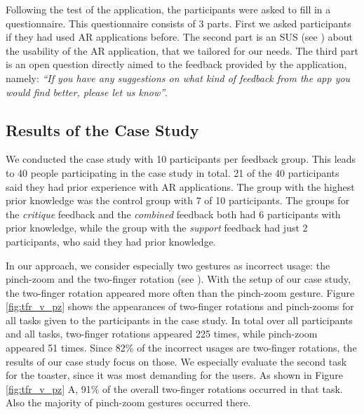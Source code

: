 \documentclass[11pt, a4paper]{article}
\begin{document}
			Following the test of the application, the participants were asked to fill in a questionnaire. This questionnaire consists of 3 parts. First we asked participants if they had used \ac{AR} applications before. The second part is an \ac{SUS} (see ) about the usability of the \ac{AR} application, that we tailored for our needs. The third part is an open question directly aimed to the feedback provided by the application, namely: \emph{``If you have any suggestions on what kind of feedback from the app you would find better, please let us know''}.

		\subsection*{Results of the Case Study}\label{ssec:results}

			We conducted the case study with 10 participants per feedback group. This leads to 40 people participating in the case study in total. 21 of the 40 participants said they had prior experience with \ac{AR} applications. The group with the highest prior knowledge was the control group with 7 of 10 participants. The groups for the \emph{critique} feedback and the \emph{combined} feedback both had 6 participants with prior knowledge, while the group with the \emph{support} feedback had just 2 participants, who said they had prior knowledge.

			In our approach, we consider especially two gestures as incorrect usage: the pinch-zoom and the two-finger rotation (see ). With the setup of our case study, the two-finger rotation appeared more often than the pinch-zoom gesture. Figure \ref{fig:tfr_v_pz} shows the appearances of two-finger rotations and pinch-zooms for all tasks given to the participants in the case study. In total over all participants and all tasks, two-finger rotations appeared 225 times, while pinch-zoom appeared 51 times. Since 82\% of the incorrect usages are two-finger rotations, the results of our case study focus on those. We especially evaluate the second task for the toaster, since it was most demanding for the users. As shown in Figure \ref{fig:tfr_v_pz} A, 91\% of the overall two-finger rotations occurred in that task. Also the majority of pinch-zoom gestures occurred there.
\end{document}
